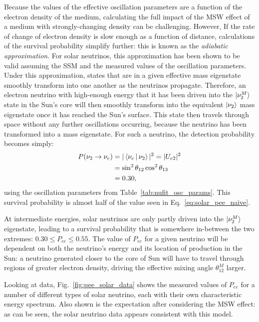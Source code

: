Because the values of the effective oscillation parameters are a function of the electron density of the medium, calculating the full impact of the MSW effect of a medium with strongly-changing density can be challenging. However, If the rate of change of electron density is slow enough as a function of distance, calculations of the survival probability simplify further: this is known as the \textit{adiabatic approximation}. For solar neutrinos, this approximation has been shown to be valid assuming the SSM and the measured values of the oscillation parameters. Under this approximation, states that are in a given effective mass eigenstate smoothly transform into one another as the neutrinos propagate. Therefore, an electron neutrino with high-enough energy that it has been driven into the $\ket{\nu_{2}^{M}}$ state in the Sun's core will then smoothly transform into the equivalent $\ket{\nu_{2}}$ mass eigenstate once it has reached the Sun's surface. This state then travels through space without any further oscillations occurring, because the neutrino has been transformed into a mass eigenstate. For such a neutrino, the detection probability becomes simply:
\begin{align}
    P(\nu_{2}\to\nu_{e}) &= |\Braket{\nu_{e}|\nu_{2}}|^{2} = |U_{e2}|^{2}\\
                         &= \sin^{2}\theta_{12}{}\cos^{2}\theta_{13}\\
                         &= 0.30,
\end{align}
using the oscillation parameters from Table~\ref{tab:nufit_osc_params}. This survival probability is almost half of the value seen in Eq.~\ref{eq:solar_pee_naive}.

At intermediate energies, solar neutrinos are only partly driven into the $\ket{\nu_{2}^{M}}$ eigenstate, leading to a survival probability that is somewhere in-between the two extremes: $0.30\leq P_{ee} \leq 0.55$. The value of $P_{ee}$ for a given neutrino will be dependent on both the neutrino's energy and its location of production in the Sun: a neutrino generated closer to the core of Sun will have to travel through regions of greater electron density, driving the effective mixing angle $\theta_{12}^{M}$ larger.

Looking at data, Fig.~\ref{fig:pee_solar_data} shows the measured values of $P_{ee}$ for a number of different types of solar neutrino, each with their own characteristic energy spectrum. Also shown is the expectation after considering the MSW effect: as can be seen, the solar neutrino data appears consistent with this model.

